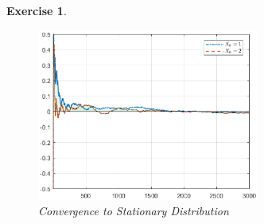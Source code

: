 \documentclass[a4paper,12pt]{article}
\newtheorem{exercise}{Exercise}
\begin{document}
\begin{exercise}
\begin{figure}[htbp]
\centering
\includegraphics[width = 0.65\textwidth]{unemployment_dynamics.eps}
\caption{Convergence to Stationary Distribution}
\label{unemployment_dynamics}
\end{figure}
\end{exercise}
\end{document}
